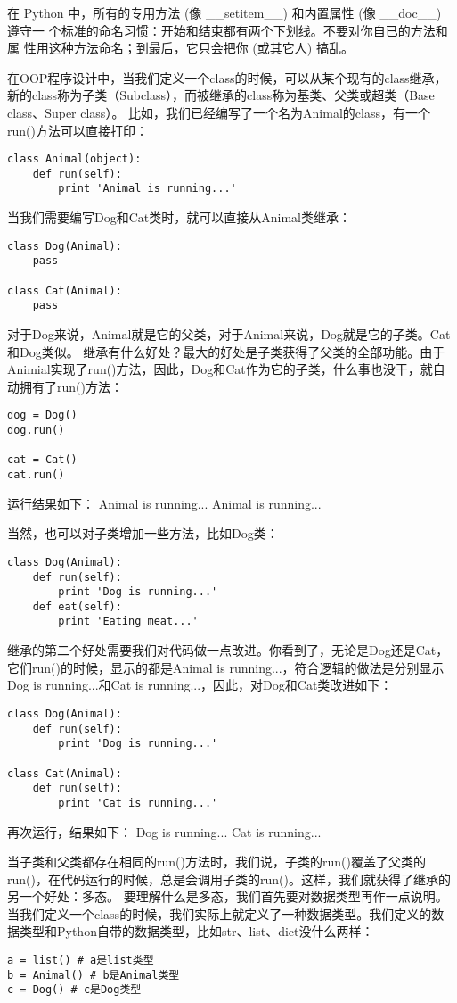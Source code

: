 \documentclass[twoside,11pt]{book}
\begin{document}
在 Python 中，所有的专用方法 (像 \_\_setitem\_\_) 和内置属性 (像 \_\_doc\_\_) 遵守一 个标准的命名习惯：开始和结束都有两个下划线。不要对你自已的方法和属 性用这种方法命名；到最后，它只会把你 (或其它人) 搞乱。


在OOP程序设计中，当我们定义一个class的时候，可以从某个现有的class继承，新的class称为子类（Subclass），而被继承的class称为基类、父类或超类（Base class、Super class）。
比如，我们已经编写了一个名为Animal的class，有一个run()方法可以直接打印：
\begin{lstlisting}
class Animal(object):
    def run(self):
        print 'Animal is running...'
\end{lstlisting}

当我们需要编写Dog和Cat类时，就可以直接从Animal类继承：
\begin{lstlisting}
class Dog(Animal):
    pass

class Cat(Animal):
    pass
\end{lstlisting}

对于Dog来说，Animal就是它的父类，对于Animal来说，Dog就是它的子类。Cat和Dog类似。
继承有什么好处？最大的好处是子类获得了父类的全部功能。由于Animial实现了run()方法，因此，Dog和Cat作为它的子类，什么事也没干，就自动拥有了run()方法：
\begin{lstlisting}
dog = Dog()
dog.run()

cat = Cat()
cat.run()
\end{lstlisting}

运行结果如下：
Animal is running...
Animal is running...

当然，也可以对子类增加一些方法，比如Dog类：
\begin{lstlisting}
class Dog(Animal):
    def run(self):
        print 'Dog is running...'
    def eat(self):
        print 'Eating meat...'
\end{lstlisting}

继承的第二个好处需要我们对代码做一点改进。你看到了，无论是Dog还是Cat，它们run()的时候，显示的都是Animal is running...，符合逻辑的做法是分别显示Dog is running...和Cat is running...，因此，对Dog和Cat类改进如下：
\begin{lstlisting}
class Dog(Animal):
    def run(self):
        print 'Dog is running...'

class Cat(Animal):
    def run(self):
        print 'Cat is running...'
\end{lstlisting}

再次运行，结果如下：
Dog is running...
Cat is running...

当子类和父类都存在相同的run()方法时，我们说，子类的run()覆盖了父类的run()，在代码运行的时候，总是会调用子类的run()。这样，我们就获得了继承的另一个好处：多态。
要理解什么是多态，我们首先要对数据类型再作一点说明。当我们定义一个class的时候，我们实际上就定义了一种数据类型。我们定义的数据类型和Python自带的数据类型，比如str、list、dict没什么两样：
\begin{lstlisting}
a = list() # a是list类型
b = Animal() # b是Animal类型
c = Dog() # c是Dog类型
\end{lstlisting}
\end{document}
